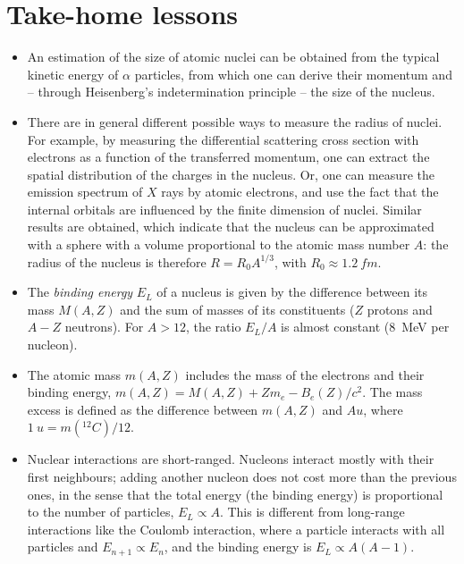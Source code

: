 \section*{Take-home lessons}
\begin{itemize}
    \item An estimation of the size of atomic nuclei can be obtained from the typical kinetic energy of $\alpha$ particles, from which one can derive their momentum and -- through Heisenberg's indetermination principle -- the size of the nucleus.
    \item There are in general different possible ways to measure the radius of nuclei. For example, by measuring the differential scattering cross section with electrons as a function of the transferred momentum, one can extract the spatial distribution of the charges in the nucleus. Or, one can measure the emission spectrum of $X$ rays by atomic electrons, and use the fact that the internal orbitals are influenced by the finite dimension of nuclei. Similar results are obtained, which indicate that the nucleus can be approximated with a sphere with a volume proportional to the atomic mass number $A$: the radius of the nucleus is therefore $R=R_0 A^{1/3}$, with $R_0\approx \SI{1.2}{fm}$.
    \item The \emph{binding energy} $E_L$ of a nucleus is given by the difference between its mass $M(A,Z)$ and the sum of masses of its constituents ($Z$ protons and $A-Z$ neutrons). For $A>12$, the ratio $E_L/A$ is almost constant (\SI{8}{MeV} per nucleon).
    \item The atomic mass $m(A,Z)$ includes the mass of the electrons and their binding energy, $m(A,Z)=M(A,Z)+Zm_e-B_e(Z)/c^2$. The mass excess is defined as the difference between $m(A,Z)$ and $A \si{u}$, where $\SI{1}{u}=m(^{12}C)/12$.
    \item Nuclear interactions are short-ranged. Nucleons interact mostly with their first neighbours; adding another nucleon does not cost more than the previous ones, in the sense that the total energy (the binding energy) is proportional to the number of particles, $E_L\propto A$. This is different from long-range interactions like the Coulomb interaction, where a particle interacts with all particles and $E_{n+1}\propto E_n$, and the binding energy is $E_L\propto A(A-1)$.

\end{itemize}
